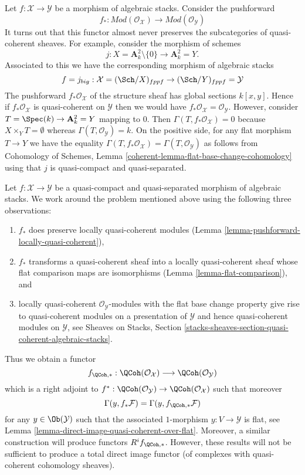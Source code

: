 \noindent
Let $f : \mathcal{X} \to \mathcal{Y}$ be a morphism of algebraic stacks.
Consider the pushforward
$$
f_* :
\textit{Mod}(\mathcal{O}_\mathcal{X})
\longrightarrow
\textit{Mod}(\mathcal{O}_\mathcal{Y})
$$
It turns out that this functor almost never preserves the subcategories
of quasi-coherent sheaves. For example, consider the morphism of schemes
$$
j : X = \mathbf{A}^2_k \setminus \{0\} \longrightarrow \mathbf{A}^2_k = Y.
$$
Associated to this we have the corresponding morphism of algebraic stacks
$$
f = j_{big} : \mathcal{X} = (\Sch/X)_{fppf} \to
(\Sch/Y)_{fppf} = \mathcal{Y}
$$
The pushforward $f_*\mathcal{O}_\mathcal{X}$ of the structure sheaf has
global sections $k[x, y]$. Hence if $f_*\mathcal{O}_\mathcal{X}$ is
quasi-coherent on $\mathcal{Y}$ then we would have
$f_*\mathcal{O}_\mathcal{X} = \mathcal{O}_\mathcal{Y}$. However,
consider $T = \Spec(k) \to \mathbf{A}^2_k = Y$ mapping to $0$.
Then $\Gamma(T, f_*\mathcal{O}_\mathcal{X}) = 0$ because
$X \times_Y T = \emptyset$ whereas $\Gamma(T, \mathcal{O}_\mathcal{Y}) = k$.
On the positive side, for any flat morphism $T \to Y$ we have the equality
$\Gamma(T, f_*\mathcal{O}_\mathcal{X}) = \Gamma(T, \mathcal{O}_\mathcal{Y})$
as follows from
Cohomology of Schemes, Lemma \ref{coherent-lemma-flat-base-change-cohomology}
using that $j$ is quasi-compact and quasi-separated.

\medskip\noindent
Let $f : \mathcal{X} \to \mathcal{Y}$ be a quasi-compact and
quasi-separated morphism of algebraic stacks. We work around the problem
mentioned above using the following three observations:
\begin{enumerate}
\item $f_*$ does preserve locally quasi-coherent
modules (Lemma \ref{lemma-pushforward-locally-quasi-coherent}),
\item $f_*$ transforms a quasi-coherent sheaf into a locally quasi-coherent
sheaf whose flat comparison maps are isomorphisms
(Lemma \ref{lemma-flat-comparison}), and
\item locally quasi-coherent $\mathcal{O}_\mathcal{Y}$-modules
with the flat base change property give rise to quasi-coherent
modules on a presentation of $\mathcal{Y}$ and hence quasi-coherent
modules on $\mathcal{Y}$, see
Sheaves on Stacks, Section
\ref{stacks-sheaves-section-quasi-coherent-algebraic-stacks}.
\end{enumerate}
Thus we obtain a functor
$$
f_{\QCoh, *} :
\QCoh(\mathcal{O}_\mathcal{X})
\longrightarrow
\QCoh(\mathcal{O}_\mathcal{Y})
$$
which is a right adjoint to
$f^* : \QCoh(\mathcal{O}_\mathcal{Y}) \to
\QCoh(\mathcal{O}_\mathcal{X})$
such that moreover
$$
\Gamma(y, f_*\mathcal{F}) = \Gamma(y, f_{\QCoh, *}\mathcal{F})
$$
for any $y \in \Ob(\mathcal{Y})$ such that the associated
$1$-morphism $y : V \to \mathcal{Y}$ is flat, see
Lemma \ref{lemma-direct-image-quasi-coherent-over-flat}.
Moreover, a similar construction will produce functors
$R^if_{\QCoh, *}$.
However, these results will not be sufficient to produce a
total direct image functor (of complexes with quasi-coherent
cohomology sheaves).


